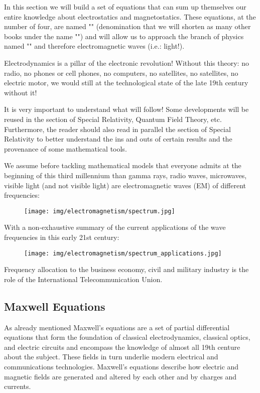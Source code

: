 	In this section we will build a set of equations that can sum up themselves our entire knowledge about electrostatics and magnetostatics. These equations, at the number of four, are named "" (denomination that we will shorten as many other books under the name "") and will allow us to approach the branch of physics named "" and therefore electromagnetic waves (i.e.: light!).
	
	Electrodynamics is a pillar of the electronic revolution! Without this theory: no radio, no phones or cell phones, no computers, no satellites, no satellites, no electric motor, we would still at the technological state of the late 19th century without it!
	\begin{tcolorbox}[title=Remark,colframe=black,arc=10pt]
	It is very important to understand what will follow! Some developments will be reused in the section of Special Relativity, Quantum Field Theory, etc. Furthermore, the reader should also read in parallel the section of Special Relativity to better understand the ins and outs of certain results and the provenance of some mathematical tools.
	\end{tcolorbox}
	We assume before tackling mathematical models that everyone admits at the beginning of this third millennium than gamma rays, radio waves, microwaves, visible light (and not visible light) are electromagnetic waves (EM) of different frequencies:
	\begin{figure}[H]
		\centering
		\texttt{[image: img/electromagnetism/spectrum.jpg]}
	\end{figure}
	With a non-exhaustive summary of the current applications of the wave frequencies in this early 21st century:
	\begin{figure}[H]
		\centering
		\texttt{[image: img/electromagnetism/spectrum\_applications.jpg]}
	\end{figure}
	Frequency allocation to the business economy, civil and military industry is the role of the International Telecommunication Union.
	
	\subsection{Maxwell Equations}\label{maxwell equations}
	As already mentioned Maxwell's equations are a set of partial differential equations that form the foundation of classical electrodynamics, classical optics, and electric circuits and encompass the knowledge of almost all 19th centure about the subject. These fields in turn underlie modern electrical and communications technologies. Maxwell's equations describe how electric and magnetic fields are generated and altered by each other and by charges and currents.
	
